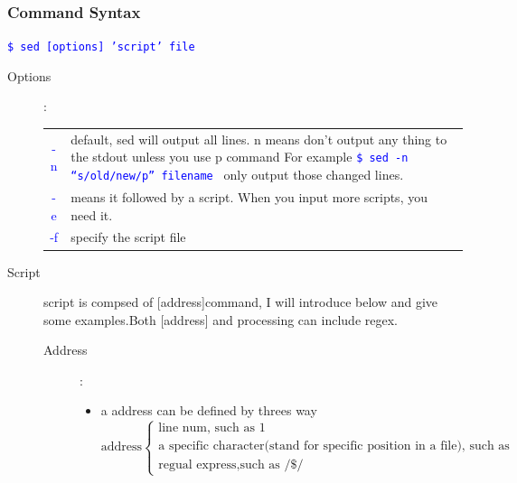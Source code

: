 \documentclass[a4paper,12pt,twoside]{book}
\newcommand{\linuxcommand}[1]{\texttt{\textcolor{blue}{\$ #1 \Pisymbol{psy}{191}}}}
\newcommand{\op}[1]{\textcolor{blue}{-#1}}
\begin{document}
\begin{CJK*}{UTF8}{song}
	\subsubsection{Command Syntax}
	\linuxcommand{sed [options] 'script' file}
		\begin{description}
			\item[Options]: \\
			\begin{tabular}{c|p{}}
			\hline
			\op{n} & default, sed will output all lines. n means don't output any thing to the stdout unless you use p command
			For example \linuxcommand{sed -n ``s/old/new/p'' filename} only output those changed lines. \\
			\op{e} & means it followed by a script. When you input more scripts, you need it. \\
			\op{f} & specify the script file\\
			\hline
			\end{tabular}
		\item[Script]
			script is compsed of [address]command, I will introduce below and give some examples.Both [address] and processing can include regex.
			\begin{description}
			\item[Address]:
				\begin{itemize}
				\item a address can be defined by threes way  \\
				
				\[ \textrm{address} \left\{ \begin{array}{l} \textrm{line num, such as 1} \\
						\textrm{a specific character(stand for specific position in a file), such as \$}  \\
						\textrm{regual express,such as /\$/}  \end{array} \right. \]
				

\end{itemize}
\end{description}
\end{description}
\end{CJK*}
\end{document}

